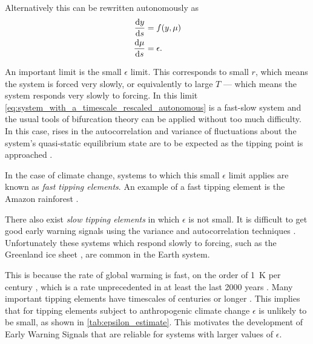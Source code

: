 Alternatively this can be rewritten autonomously as
\begin{subequations}
  \label{eq:system_with_a_timescale_rescaled_autonomous}
  \begin{align}
    \dv{y}{s} &= f(y,\mu) \\
    \dv{\mu}{s} &= \epsilon.
  \end{align}
\end{subequations}

An important limit  is the small $\epsilon$ limit. This corresponds to small $r$, which means the system is forced very slowly, or equivalently to
large $T$ --- which means the system responds very slowly to forcing. In this limit \cref{eq:system_with_a_timescale_rescaled_autonomous} is a
fast-slow system \parencite{Kuehn2011} and the usual tools of bifurcation theory can be applied without too much difficulty. In this case,
rises in the autocorrelation and variance of fluctuations about the system's quasi-static equilibrium state are to be expected as the tipping point is approached  \parencite{Scheffer2009}.

In the case of climate change, systems to which this small $\epsilon$ limit applies are known as \emph{fast tipping elements}. An example of a fast tipping element is
the Amazon rainforest \parencite{Ritchie2021}.

There also exist \emph{slow tipping elements} in which $\epsilon$ is not small. It is difficult to get good early warning signals
using the variance and autocorrelation techniques \parencite{VanderBolt2021}. Unfortunately these systems which respond slowly to forcing, such as the Greenland ice
sheet \parencite{Ritchie2021}, are common in the Earth system.

This is because the rate of global warming is fast, on the order of \SI{1}{\kelvin} per century \parencite{Osborn2021}, which is a rate unprecedented in at least
the last 2000 years \parencite{AR6}. Many important tipping elements have timescales of centuries or longer \parencite{Lenton2008,ArmstrongMcKay2022}.
This implies that for tipping elements subject to anthropogenic climate change $\epsilon$ is unlikely to be small, as shown in \cref{tab:epsilon_estimate}.
This motivates the development of Early Warning Signals that are reliable for systems with larger values of $\epsilon$.

